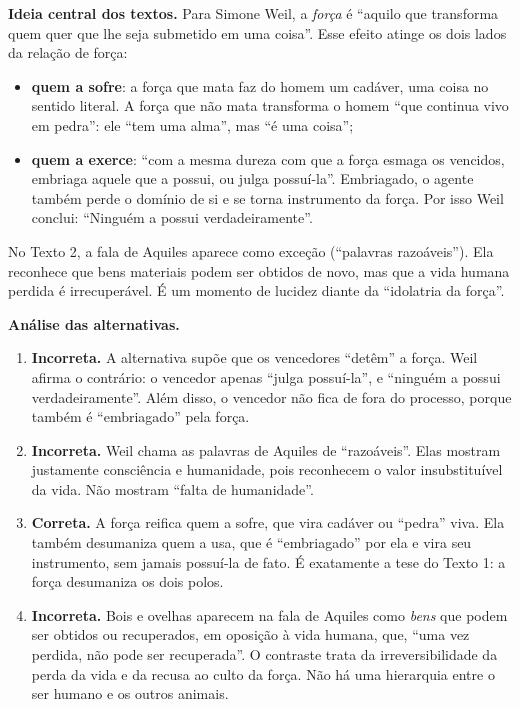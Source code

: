\documentclass{article}%
\begin{document}
\textbf{Ideia central dos textos.} Para Simone Weil, a \emph{força} é ``aquilo que transforma quem quer que lhe seja submetido em uma coisa''. Esse efeito atinge os dois lados da relação de força:
\begin{itemize}
  \item \textbf{quem a sofre}: a força que mata faz do homem um cadáver, uma coisa no sentido literal. A força que não mata transforma o homem ``que continua vivo em pedra'': ele ``tem uma alma'', mas ``é uma coisa'';
  \item \textbf{quem a exerce}: ``com a mesma dureza com que a força esmaga os vencidos, embriaga aquele que a possui, ou julga possuí-la''. Embriagado, o agente também perde o domínio de si e se torna instrumento da força. Por isso Weil conclui: ``Ninguém a possui verdadeiramente''.
\end{itemize}
No Texto 2, a fala de Aquiles aparece como exceção (``palavras razoáveis''). Ela reconhece que bens materiais podem ser obtidos de novo, mas que a vida humana perdida é irrecuperável. É um momento de lucidez diante da ``idolatria da força''.

\textbf{Análise das alternativas.}

\begin{enumerate}
  \item[a)] \textbf{Incorreta.} A alternativa supõe que os vencedores ``detêm'' a força. Weil afirma o contrário: o vencedor apenas ``julga possuí-la'', e ``ninguém a possui verdadeiramente''. Além disso, o vencedor não fica de fora do processo, porque também é ``embriagado'' pela força.
  \item[b)] \textbf{Incorreta.} Weil chama as palavras de Aquiles de ``razoáveis''. Elas mostram justamente consciência e humanidade, pois reconhecem o valor insubstituível da vida. Não mostram ``falta de humanidade''.
  \item[c)] \textbf{Correta.} A força reifica quem a sofre, que vira cadáver ou ``pedra'' viva. Ela também desumaniza quem a usa, que é ``embriagado'' por ela e vira seu instrumento, sem jamais possuí-la de fato. É exatamente a tese do Texto 1: a força desumaniza os dois polos.
  \item[d)] \textbf{Incorreta.} Bois e ovelhas aparecem na fala de Aquiles como \emph{bens} que podem ser obtidos ou recuperados, em oposição à vida humana, que, ``uma vez perdida, não pode ser recuperada''. O contraste trata da irreversibilidade da perda da vida e da recusa ao culto da força. Não há uma hierarquia entre o ser humano e os outros animais.
\end{enumerate}
\end{document}
